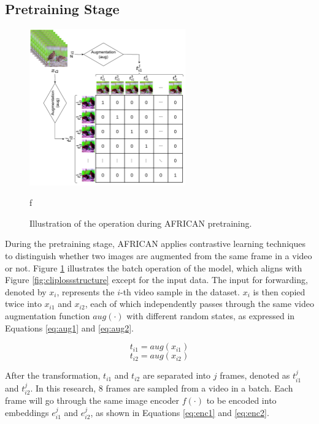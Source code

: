 \subsection{Pretraining Stage}

\begin{figure}[ht]
    \centering
    \includegraphics[width=0.6\textwidth]{assets/charts/3_3_ConstrastiveSimilarityMatrix}
    \caption[Operation of pretraining AFRICAN]{Illustration of the operation during AFRICAN pretraining.}
f\label{fig:modelstructafsim}
\end{figure}

During the pretraining stage, AFRICAN applies contrastive learning techniques to distinguish whether two images are augmented from the same frame in a video or not. Figure \ref{fig:modelstructafsim} illustrates the batch operation of the model, which aligns with Figure \ref{fig:cliplossstructure} except for the input data. The input for forwarding, denoted by $x_i$, represents the $i$-th video sample in the dataset. $x_i$ is then copied twice into $x_{i1}$ and $x_{i2}$, each of which independently passes through the same video augmentation function $aug(\cdot)$ with different random states, as expressed in Equations \ref{eq:aug1} and \ref{eq:aug2}. 

\begin{equation}
    \label{eq:aug1}
    t_{i1} = aug(x_{i1})
\end{equation}
\begin{equation}
    \label{eq:aug2}
    t_{i2} = aug(x_{i2})
\end{equation}

After the transformation, $t_{i1}$ and $t_{i2}$ are separated into $j$ frames, denoted as $t_{i1}^j$ and $t_{i2}^j$. In this research, 8 frames are sampled from a video in a batch. Each frame will go through the same image encoder $f(\cdot)$ to be encoded into embeddings $e_{i1}^j$ and $e_{i2}^j$, as shown in Equations \ref{eq:enc1} and \ref{eq:enc2}.

